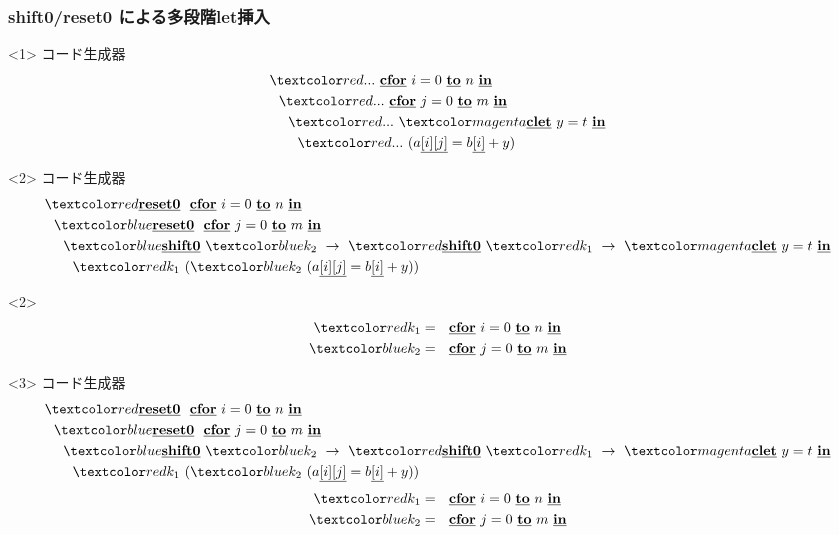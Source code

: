\begin{frame}
  \frametitle{shift0/reset0 による多段階let挿入}
  \begin{onlyenv}<1>
    コード生成器
    \begin{align*}
      & \red{...}~ \cforin{i = 0}{n} \\
      & ~~\red{...}~ \cforin{j = 0}{m} \\
      & ~~~~\red{...}~ \magenta{\cLet~y=t~\cIn} \\
      & ~~~~~~\red{...}~ (a\cArrays{i}{j} = b\cArray{i} + y)
    \end{align*}
  \end{onlyenv}

  \begin{onlyenv}<2>
    コード生成器
    \begin{align*}
      & \red{\cResetz} ~~\cforin{i = 0}{n} \\
      & ~~\blue{\cResetz} ~~\cforin{j = 0}{m} \\
      & ~~~~\blue{\cShiftz}~\blue{k_2}~\to~ \red{\cShiftz}~\red{k_1}~\to~ \magenta{\cLet~y=t~\cIn} \\
      & ~~~~~~\red{k_1}~(\blue{k_2}~(a\cArrays{i}{j} = b\cArray{i} + y))
    \end{align*}
    \begin{invisibleenv}<2>
      \begin{align*}
        \red{k_1} &= ~~\cforin{i = 0}{n} \\
        \blue{k_2} &= ~~\cforin{j = 0}{m} \\
      \end{align*}
    \end{invisibleenv}
  \end{onlyenv}

  \begin{onlyenv}<3>
    コード生成器
    \begin{align*}
      & \red{\cResetz} ~~\cforin{i = 0}{n} \\
      & ~~\blue{\cResetz} ~~\cforin{j = 0}{m} \\
      & ~~~~\blue{\cShiftz}~\blue{k_2}~\to~ \red{\cShiftz}~\red{k_1}~\to~ \magenta{\cLet~y=t~\cIn} \\
      & ~~~~~~\red{k_1}~(\blue{k_2}~(a\cArrays{i}{j} = b\cArray{i} + y))
    \end{align*}
    \begin{align*}
      \red{k_1} &= ~~\cforin{i = 0}{n} \\
      \blue{k_2} &= ~~\cforin{j = 0}{m} \\
    \end{align*}
  \end{onlyenv}


\end{frame}
